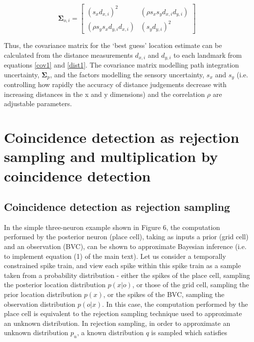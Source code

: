 \begin{equation}\label{dist1}
\boldsymbol \Sigma_{o, i} = \begin{bmatrix} (s_x  d_{x, i})^2  & (\rho s_x  s_y  d_{x, i}  d_{y, i})  \\ (\rho s_y s_x  d_{y, i}  d_{x, i})  & (s_y  d_{y, i})^2  \end{bmatrix}
\end{equation}

Thus, the covariance matrix for the `best guess' location estimate can be calculated from the distance measurements $ d_{x, i} $ and $ d_{y, i} $ to each landmark from equations \eqref{cov1} and \eqref{dist1}. The covariance matrix modelling path integration uncertainty, $ \boldsymbol \Sigma_p $, and the factors modelling the sensory uncertainty, $s_x$ and $s_y$ (i.e. controlling how rapidly the accuracy of distance judgements decrease with increasing distances in the x and y dimensions) and the correlation $\rho$ are adjustable parameters.



\section{Coincidence detection as rejection sampling and multiplication by coincidence detection}

\subsection*{Coincidence detection as rejection sampling}

In the simple three-neuron example shown in Figure 6, the computation performed by the posterior neuron (place cell), taking as inputs a prior (grid cell) and an observation (BVC), can be shown to approximate Bayesian inference (i.e. to implement equation (1) of the main text). Let us consider a temporally constrained spike train, and view each spike within this spike train as a sample taken from a probability distribution - either the spikes of the place cell, sampling the posterior location distribution $ p(x|o) $, or those of the grid cell, sampling the prior location distribution $ p(x) $, or the spikes of the BVC, sampling the observation distribution $ p(o|x) $.
In this case, the computation performed by the place cell is equivalent to the rejection sampling technique \cite{Liu1996, Bishop2006} used to approximate an unknown distribution. In rejection sampling, in order to approximate an unknown distribution $p_u$, a known distribution $q$ is sampled which satisfies 

